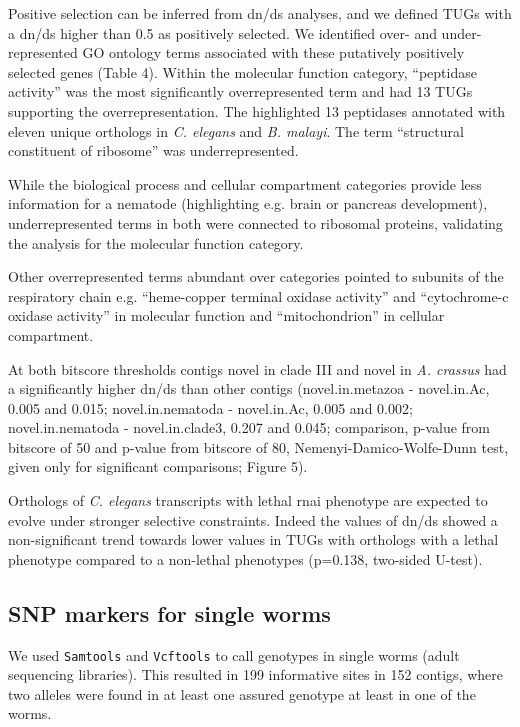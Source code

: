 \documentclass[10pt]{bmc_article}
\newenvironment{bmcformat}{\begin{raggedright}\baselineskip20pt\sloppy\setboolean{publ}{false}}{\end{raggedright}\baselineskip20pt\sloppy}
\begin{document}
\begin{bmcformat}
Positive selection can be inferred from dn/ds analyses, and we defined
TUGs with a dn/ds higher than 0.5 as positively selected. We
identified over- and under-represented GO ontology terms associated
with these putatively positively selected genes (Table 4). Within the
molecular function category, ``peptidase activity'' was the most
significantly overrepresented term and had 13 TUGs supporting the
overrepresentation. The highlighted 13 peptidases annotated with
eleven unique orthologs in \textit{C. elegans} and \textit{B. malayi}.
The term ``structural constituent of ribosome'' was underrepresented.

While the biological process and cellular compartment categories
provide less information for a nematode (highlighting e.g. brain or
pancreas development), underrepresented terms in both were connected
to ribosomal proteins, validating the analysis for the molecular
function category.

Other overrepresented terms abundant over categories pointed to
subunits of the respiratory chain e.g. ``heme-copper terminal oxidase
activity'' and ``cytochrome-c oxidase activity'' in molecular function
and ``mitochondrion'' in cellular compartment.

At both bitscore thresholds contigs novel in clade III and novel in
\textit{A. crassus} had a significantly higher dn/ds than other contigs
(novel.in.metazoa - novel.in.Ac, 0.005 and 0.015; novel.in.nematoda -
novel.in.Ac, 0.005 and 0.002; novel.in.nematoda - novel.in.clade3,
0.207 and 0.045; comparison, p-value from bitscore of 50 and p-value
from bitscore of 80, Nemenyi-Damico-Wolfe-Dunn test, given only for
significant comparisons; Figure 5).

Orthologs of \textit{C. elegans} transcripts with lethal
rnai phenotype are expected to evolve under stronger selective
constraints. Indeed the values of dn/ds showed a non-significant trend
towards lower values in TUGs with orthologs with a lethal phenotype
compared to a non-lethal phenotypes
(p=0.138, two-sided U-test).

\subsection*{SNP markers for single worms}

We used \texttt{Samtools}\cite{journals/bioinformatics/LiHWFRHMAD09}
and \texttt{Vcftools}\cite{pmid21653522} to call genotypes in single
worms (adult sequencing libraries). This resulted in 199
informative sites in 152 contigs, where two alleles
were found in at least one assured genotype at least in one of the
worms.


\end{bmcformat}
\end{document}
